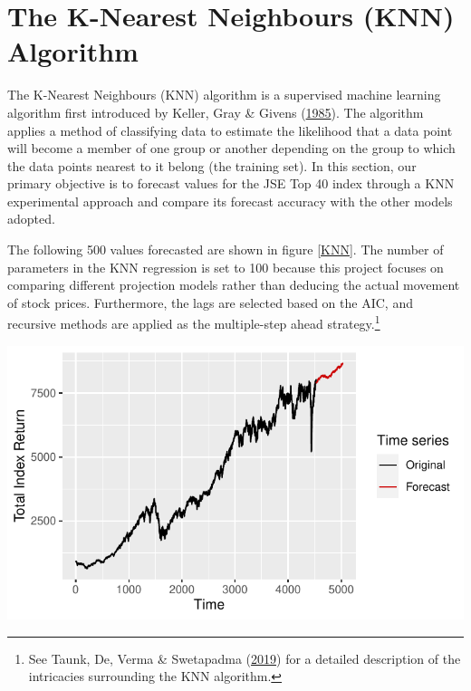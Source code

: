 \documentclass[11pt,preprint, authoryear]{elsarticle}
\let\origfigure\figure
\let\endorigfigure\endfigure
\renewenvironment{figure}[1][2] {
    \expandafter\origfigure\expandafter[H]
} {
    \endorigfigure
}
\numberwithin{equation}{section}
\numberwithin{figure}{section}
\numberwithin{table}{section}
\let\rmarkdownfootnote\footnote%
\def\footnote{\protect\rmarkdownfootnote}
\begin{document}
\hypertarget{the-k-nearest-neighbours-knn-algorithm}{%
\section{The K-Nearest Neighbours (KNN)
Algorithm}\label{the-k-nearest-neighbours-knn-algorithm}}

The K-Nearest Neighbours (KNN) algorithm is a supervised machine
learning algorithm first introduced by Keller, Gray \& Givens
(\protect\hyperlink{ref-keller1985}{1985}). The algorithm applies a
method of classifying data to estimate the likelihood that a data point
will become a member of one group or another depending on the group to
which the data points nearest to it belong (the training set). In this
section, our primary objective is to forecast values for the JSE Top 40
index through a KNN experimental approach and compare its forecast
accuracy with the other models adopted.

The following 500 values forecasted are shown in figure \ref{KNN}. The
number of parameters in the KNN regression is set to 100 because this
project focuses on comparing different projection models rather than
deducing the actual movement of stock prices. Furthermore, the lags are
selected based on the AIC, and recursive methods are applied as the
multiple-step ahead strategy.\footnote{See Taunk, De, Verma \&
  Swetapadma (\protect\hyperlink{ref-taunk2019}{2019}) for a detailed
  description of the intricacies surrounding the KNN algorithm.}

\begin{figure}[H]

{\centering \includegraphics{JSE_Top40_Predictions_Using_Machine_Learning_files/figure-latex/unnamed-chunk-5-1} 

}

\caption{Forecasted JSE Top 40 index using the k-nearest neigbours algorithm.\label{KNN}}\label{fig:unnamed-chunk-5}
\end{figure}
\end{document}
